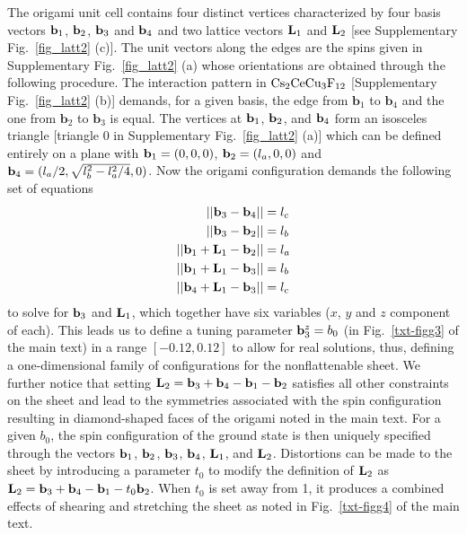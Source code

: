 \documentclass[a4paper,aps,prl,floatfix,showpacs,superscriptaddress,notitlepage]{revtex4-1}
\def\bvec{\mathbf{b}} %
\begin{document}
The origami unit cell contains four distinct vertices characterized by four basis vectors ${\bf b}_1$, ${\bf b}_2$, ${\bf b}_3$ and ${\bf b}_4$ and two lattice vectors ${\bf L}_1$ and ${\bf L}_2$ [see Supplementary Fig.~\ref{fig_latt2} (c)]. The unit vectors along the edges are the spins given in Supplementary Fig.~\ref{fig_latt2} (a) whose orientations are obtained through the following procedure. The interaction pattern in ${\rm Cs}_2{\rm CeCu}_3{\rm F}_{12}$ [Supplementary Fig.~\ref{fig_latt2} (b)] demands, for a given basis, the edge from $\bvec_1$ to $\bvec_4$ and the one from $\bvec_2$ to $\bvec_3$ is equal. The vertices at ${\bf b}_1$, ${\bf b}_2$, and ${\bf b}_4$ form an isosceles triangle [triangle 0 in Supplementary Fig.~\ref{fig_latt2} (a)] which can be defined entirely on a plane with ${\bf b}_1=(0,0,0)$, ${\bf b}_2=(l_a,0,0)$ and ${\bf b}_4=(l_a/2,\sqrt{l_b^2-l_a^2/4},0)$. Now the origami configuration demands the following set of equations
\begin{equation}
\begin{split}
 || {\bf b}_3 - {\bf b}_4 || &= l_c \\ 
 || {\bf b}_3 - {\bf b}_2 || &= l_b \\ 
 ||{\bf b}_1 + {\bf L}_1 - {\bf b}_2 || &= l_a \\ 
 ||{\bf b}_1 + {\bf L}_1 - {\bf b}_3 || &= l_b \\ 
 ||{\bf b}_4 + {\bf L}_1 - {\bf b}_3 || &= l_c \\ 
\end{split}
\end{equation}
to solve for ${\bf b}_3$ and ${\bf L}_1$, which together have six variables ($x$, $y$ and $z$ component of each). This leads us to define a tuning parameter ${\bf b}_3^z=b_0$ (in Fig.~\ref{txt-figg3} of the main text) in a range $[-0.12,0.12]$ to allow for real solutions, thus, defining a one-dimensional family of configurations for the nonflattenable sheet. We further notice that setting ${\bf L}_2={\bf b}_3+{\bf b}_4-{\bf b}_1-{\bf b}_2$ satisfies all other constraints on the sheet and lead to the symmetries associated with the spin configuration resulting in diamond-shaped faces of the origami noted in the main text. For a given $b_0$, the spin configuration of the ground state is then uniquely specified through the vectors ${\bf b}_1$, ${\bf b}_2$, ${\bf b}_3$, ${\bf b}_4$, ${\bf L}_1$, and ${\bf L}_2$. Distortions can be made to the sheet by introducing a parameter $t_0$ to modify the definition of ${\bf L}_2$ as ${\bf L}_2={\bf b}_3+{\bf b}_4-{\bf b}_1-t_0{\bf b}_2$. When $t_0$ is set away from 1, it produces a combined effects of shearing and stretching the sheet as noted in Fig.~\ref{txt-figg4} of the main text. \\
\end{document}
